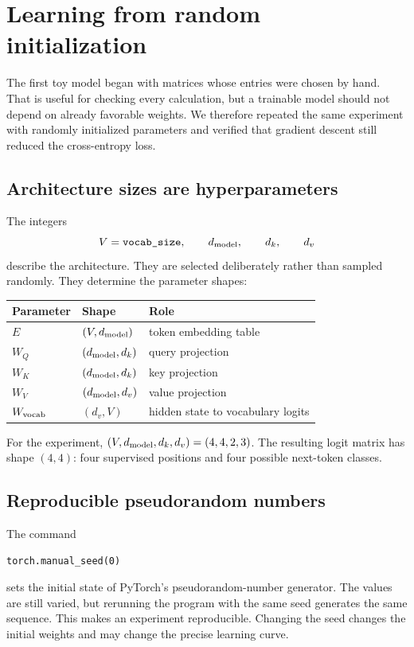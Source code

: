 \documentclass[11pt]{article}
\begin{document}
\section{Learning from random initialization}

The first toy model began with matrices whose entries were chosen by hand. That is useful for checking every
calculation, but a trainable model should not depend on already favorable weights. We therefore repeated the
same experiment with randomly initialized parameters and verified that gradient descent still reduced the
cross-entropy loss.

\subsection{Architecture sizes are hyperparameters}

The integers
\[
  V=\texttt{vocab\_size},\qquad d_{\rm model},\qquad d_k,\qquad d_v
\]
describe the architecture. They are selected deliberately rather than sampled randomly. They determine the
parameter shapes:
\begin{center}
\begin{tabular}{lll}
\toprule
Parameter & Shape & Role\\
\midrule
$E$ & $(V,d_{\rm model})$ & token embedding table\\
$W_Q$ & $(d_{\rm model},d_k)$ & query projection\\
$W_K$ & $(d_{\rm model},d_k)$ & key projection\\
$W_V$ & $(d_{\rm model},d_v)$ & value projection\\
$W_{\rm vocab}$ & $(d_v,V)$ & hidden state to vocabulary logits\\
\bottomrule
\end{tabular}
\end{center}
For the experiment, $(V,d_{\rm model},d_k,d_v)=(4,4,2,3)$. The resulting logit matrix has shape $(4,4)$:
four supervised positions and four possible next-token classes.

\subsection{Reproducible pseudorandom numbers}

The command
\begin{lstlisting}
torch.manual_seed(0)
\end{lstlisting}
sets the initial state of PyTorch's pseudorandom-number generator. The values are still varied, but rerunning
the program with the same seed generates the same sequence. This makes an experiment reproducible. Changing
the seed changes the initial weights and may change the precise learning curve.
\end{document}
